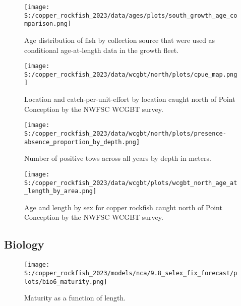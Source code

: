 \documentclass[11pt,
  english,
  letterpaper,
]{article}
\begin{document}
\pagebreak

\begin{figure}
\centering
\texttt{[image: S:/copper\_rockfish\_2023/data/ages/plots/south\_growth\_age\_comparison.png]}
\caption{Age distribution of fish by collection source that were used as conditional age-at-length data in the growth fleet.\label{fig:growth-age-dist}}
\end{figure}

\pagebreak

\begin{figure}
\centering
\texttt{[image: S:/copper\_rockfish\_2023/data/wcgbt/north/plots/cpue\_map.png]}
\caption{Location and catch-per-unit-effort by location caught north of Point Conception by the NWFSC WCGBT survey.\label{fig:wcgbt-cpue}}
\end{figure}

\pagebreak

\begin{figure}
\centering
\texttt{[image: S:/copper\_rockfish\_2023/data/wcgbt/north/plots/presence-absence\_proportion\_by\_depth.png]}
\caption{Number of positive tows across all years by depth in meters.\label{fig:wcgbt-depth}}
\end{figure}

\pagebreak

\begin{figure}
\centering
\texttt{[image: S:/copper\_rockfish\_2023/data/wcgbt/plots/wcgbt\_north\_age\_at\_length\_by\_area.png]}
\caption{Age and length by sex for copper rockfish caught north of Point Conception by the NWFSC WCGBT survey.\label{fig:wcgbt-len-age}}
\end{figure}

\pagebreak

\hypertarget{biology}{%
\subsection{Biology}\label{biology}}

\begin{figure}
\centering
\texttt{[image: S:/copper\_rockfish\_2023/models/nca/9.8\_selex\_fix\_forecast/plots/bio6\_maturity.png]}
\caption{Maturity as a function of length.\label{fig:maturity}}
\end{figure}

\pagebreak
\end{document}
